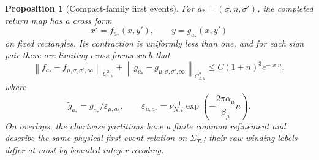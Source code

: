\documentclass[11pt,reqno]{amsart}
\numberwithin{equation}{section}
\newtheorem{proposition}[theorem]{Proposition}
\theoremstyle{definition}
\theoremstyle{remark}
\newcommand{\norm}[1]{\left\lVert #1\right\rVert}
\begin{document}
\begin{proposition}[Compact-family first events]
For $a_*=(\sigma,n,\sigma')$, the completed return map has a cross form
\begin{equation}\label{eq:cross-form}
 x'=f_{a_*}(x,y'),\qquad y=g_{a_*}(x,y')
\end{equation}
on fixed rectangles.  Its contraction is uniformly less than one, and for
each sign pair there are limiting cross forms such that
\begin{equation}\label{eq:cross-convergence}
 \norm{f_{a_*}-f_{\mu,\sigma,\sigma',\infty}}_{C^2_{z,\mu}}
 +\norm{\widetilde g_{a_*}-
       \widetilde g_{\mu,\sigma,\sigma',\infty}}_{C^2_{z,\mu}}
 \le C(1+n)^3e^{-\varkappa n},
\end{equation}
where
\begin{equation}\label{eq:g-scale}
 \widetilde g_{a_*}=g_{a_*}/\varepsilon_{\mu,a_*},\qquad
 \varepsilon_{\mu,a_*}
 =\nu_{N,i}^{-1}
  \exp\!\left(-\frac{2\pi\alpha_\mu}{\beta_\mu}n\right).
\end{equation}
On overlaps, the chartwise partitions have a finite common refinement and
describe the same physical first-event relation on $\Sigma_{T_*}$; their raw
winding labels differ at most by bounded integer recoding.
\end{proposition}
\end{document}
